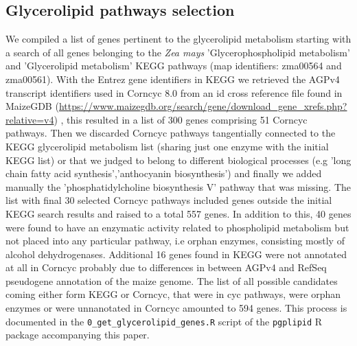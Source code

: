 \documentclass[9pt,twocolumn,twoside,lineno]{gsajnl}
\begin{document}
\subsection{Glycerolipid pathways selection}
We compiled a list of genes pertinent to the glycerolipid metabolism starting with a search of all genes belonging to the \textit{Zea mays} 'Glycerophospholipid metabolism' and 'Glycerolipid metabolism' KEGG pathways \cite{kanehisa2019} (map identifiers: zma00564 and zma00561). 
With the Entrez gene identifiers in KEGG we retrieved the AGPv4 transcript identifiers used in Corncyc 8.0 \cite{portwood2019, walsh2016} from an id cross reference file found in MaizeGDB (\href{https://www.maizegdb.org/search/gene/download_gene_xrefs.php?relative=v4}{https://www.maizegdb.org/search/gene/download_gene_xrefs.php?relative=v4}) \cite{portwood2019}, this resulted in a list of 300 genes comprising 51 Corncyc pathways. 
Then we discarded Corncyc pathways  tangentially connected to the KEGG glycerolipid metabolism list (sharing just one enzyme with the initial KEGG list) or that we judged to belong to different biological processes (e.g 'long chain fatty acid synthesis','anthocyanin biosynthesis') and finally we added manually the 'phosphatidylcholine biosynthesis V' pathway that was missing. 
The list with final 30 selected Corncyc pathways included genes outside the initial KEGG search results and raised to a total 557 genes. 
In addition to this, 40 genes were found to have an enzymatic activity related to phospholipid metabolism but not placed into any particular pathway, i.e orphan enzymes, consisting mostly of alcohol dehydrogenases. 
Additional 16 genes found in KEGG were not annotated at all in Corncyc probably due to differences in between AGPv4 and RefSeq pseudogene annotation of the maize genome. 
The list of all possible candidates coming either form KEGG or Corncyc, that were in cyc pathways, were orphan enzymes or were unnanotated in Corncyc amounted to 594 genes. This process is documented in the \verb|0_get_glycerolipid_genes.R| script of the \verb|pgplipid| R package accompanying this paper.
\end{document}
